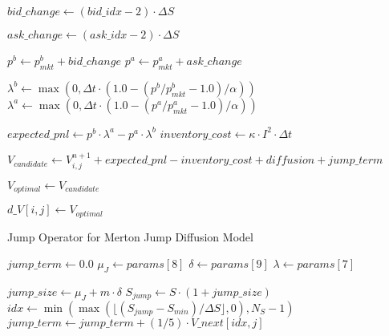 \documentclass[twocolumn,ieee]{arithmaxresearch}
\begin{document}
\begin{onecolumn}
\begin{onecolumn}
\begin{algorithm}
\begin{algorithmic}[1]
     
        \State $bid\_change \gets (bid\_idx - 2) \cdot \Delta S$
        
            \State $ask\_change \gets (ask\_idx - 2) \cdot \Delta S$
            
            \State $p^b \gets p^b_{mkt} + bid\_change$
            \State $p^a \gets p^a_{mkt} + ask\_change$
            
             
            
                \State $\lambda^b \gets \max(0, \Delta t \cdot (1.0 - (p^b/p^b_{mkt} - 1.0)/\alpha))$
                \State $\lambda^a \gets \max(0, \Delta t \cdot (1.0 - (p^a/p^a_{mkt} - 1.0)/\alpha))$
                
                \State $expected\_pnl \gets p^b \cdot \lambda^a - p^a \cdot \lambda^b$
                \State $inventory\_cost \gets \kappa \cdot I^2 \cdot \Delta t$
                
                \State $V_{candidate} \gets V^{n+1}_{i,j} + expected\_pnl - inventory\_cost + diffusion + jump\_term$
                
                    \State $V_{optimal} \gets V_{candidate}$
                \EndIf
            \EndIf
        \EndFor
    \EndFor
    
    \State $d\_V[i,j] \gets V_{optimal}$
\EndIf
\end{algorithmic}
\end{algorithm}


\begin{algorithm}
\caption{Jump Operator for Merton Jump Diffusion Model}
\begin{algorithmic}[1]
    \State $jump\_term \gets 0.0$
    \State $\mu_J \gets params[8]$ 
    \State $\delta \gets params[9]$ 
    \State $\lambda \gets params[7]$ 
    
     
        \State $jump\_size \gets \mu_J + m \cdot \delta$
        \State $S_{jump} \gets S \cdot (1 + jump\_size)$
        \State $idx \gets \min(\max(\lfloor(S_{jump} - S_{min})/\Delta S\rfloor, 0), N_S-1)$
        \State $jump\_term \gets jump\_term + (1/5) \cdot V\_next[idx,j]$
    \EndFor
    

\end{algorithmic}
\end{algorithm}
\end{onecolumn}
\end{onecolumn}
\end{document}
